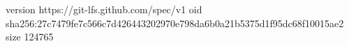 version https://git-lfs.github.com/spec/v1
oid sha256:27c7479fe7c566c7d426443202970e798da6b0a21b5375d1f95dc68f10015ae2
size 124765
